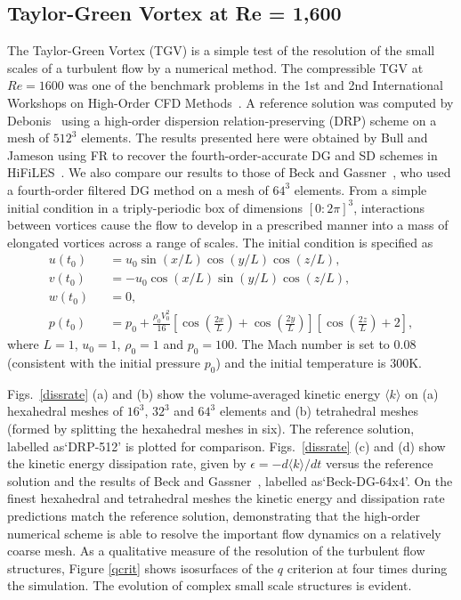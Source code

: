 \graphicspath{{figures_taylorgreen/}}%

\subsection{Taylor-Green Vortex at Re = 1,600}

The Taylor-Green Vortex (TGV) is a simple test of the resolution of the small scales of a turbulent flow by a numerical method.
The compressible TGV at $Re=1600$ was one of the benchmark problems in the 1st and 2nd International Workshops on High-Order CFD Methods~\cite{wang2013}.
A reference solution was computed by Debonis~\cite{debonis:13} using a high-order dispersion relation-preserving (DRP) scheme on a mesh of $512^3$ elements.
The results presented here were obtained by Bull and Jameson using FR to recover the fourth-order-accurate DG and SD schemes in HiFiLES~\cite{bull2014a,bull2014b}.
We also compare our results to those of Beck and Gassner~\cite{beck:12}, who used a fourth-order filtered DG method on a mesh of $64^3$ elements.
From a simple initial condition in a triply-periodic box of dimensions $[0:2\pi]^3$, interactions between vortices cause the flow to develop in a prescribed manner into a mass of elongated vortices across a range of scales.
The initial condition is specified as
%
\begin{eqnarray}\label{tgv}
u(t_0) &&= u_0 \sin (x/L) \cos (y/L) \cos (z/L), \\
v(t_0) &&= -u_0 \cos (x/L) \sin (y/L) \cos (z/L), \\
w(t_0) &&= 0, \\
p(t_0) &&= p_0 + \frac{\rho_0 V^2_0}{16} \left [ \cos \left (\frac{2x}{L} \right ) + \cos \left (\frac{2y}{L} \right ) \right ] \left [ \cos \left (\frac{2z}{L} \right ) + 2 \right ],
\end{eqnarray}
%
where $L = 1$, $u_0 = 1$, $\rho_0 = 1$ and $p_0 = 100$.
The Mach number is set to 0.08 (consistent with the initial pressure $p_0$) and the initial temperature is 300K.

Figs.~\ref{dissrate} (a) and (b) show the volume-averaged kinetic energy $\langle k \rangle$  on (a) hexahedral meshes of $16^3$, $32^3$ and $64^3$ elements and (b) tetrahedral meshes (formed by splitting the hexahedral meshes in six).
The reference solution, labelled as`DRP-512' is plotted for comparison.
Figs.~\ref{dissrate} (c) and (d) show the kinetic energy dissipation rate, given by $\epsilon = -d \langle k \rangle/dt$ versus the reference solution and the results of Beck and Gassner~\cite{beck:12}, labelled as`Beck-DG-64x4'.
On the finest hexahedral and tetrahedral meshes the kinetic energy and dissipation rate predictions match the reference solution, demonstrating that the high-order numerical scheme is able to resolve the important flow dynamics on a relatively coarse mesh.
As a qualitative measure of the resolution of the turbulent flow structures, Figure \ref{qcrit} shows isosurfaces of the $q$ criterion at four times during the simulation.
The evolution of complex small scale structures is evident.


